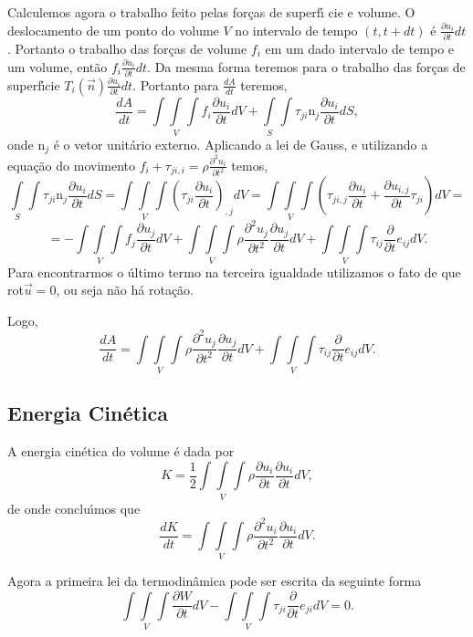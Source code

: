 Calculemos agora  o trabalho feito pelas for\c{c}as de superf\'\i
cie e volume. O deslocamento de um ponto do volume $V$ no
intervalo de tempo $(t,t+dt)$ \'e $\frac{\partial u_{i}}{\partial
t}dt$. Portanto o trabalho das  for\c{c}as de volume $f_{i}$ em um
dado intervalo de tempo e um volume, ent\~ao $f_{i}\frac{\partial
u_{i}}{\partial t}dt$. Da mesma forma teremos para o trabalho das
for\c{c}as de  superf\'\i cie $T_{i}(\vec{n})\frac{\partial
u_{i}}{\partial t}dt$. Portanto para $\frac{dA}{dt}$ teremos,
\[\frac{dA}{dt}=\int \! \!\int\limits_{V} \! \!\int f_{i}\frac{\partial u_{i}}{\partial t}dV+\int\limits_{S} \! \!\int
\tau_{ji}\mbox{n}_{j}\frac{\partial u_{i}}{\partial t}dS,\] onde
$\mbox{n}_{j}$ \'e o vetor unit\'ario externo. Aplicando a lei de
Gauss, e utilizando a equa\c{c}\~ao do movimento $f_{i}+\tau_{ji,i}=\rho\frac{\partial^{2}u_{i}}{\partial t^{2}}$ temos,
\[\int\limits_{S} \! \!\int \tau_{ji}\mbox{n}_{j}\frac{\partial u_{i}}{\partial t}dS=
\int \! \!\int\limits_{V} \! \!\int \left(\tau_{ji}\frac{\partial
u_{i}}{\partial t}\right)_{,j}dV= \int \! \!\int\limits_{V} \!
\!\int \left(\tau_{ji,j}\frac{\partial u_{i}}{\partial t}+
\frac{\partial u_{i,j}}{\partial t}\tau_{ji}\right)dV=\]
\[=-\int \! \!\int\limits_{V} \! \!\int f_{j}\frac{\partial u_{j}}{\partial t}dV+
\int \! \!\int\limits_{V} \! \!\int \rho\frac{\partial^{2}
u_{j}}{\partial t^{2}}\frac{\partial u_{j}}{\partial t}dV+ \int \!
\!\int\limits_{V} \! \!\int \tau_{ij}\frac{\partial}{\partial
t}e_{ij}dV.\] Para encontrarmos o \'ultimo termo na terceira igualdade utilizamos o fato de que rot$\vec{u}=0$, ou 
seja n\~ao h\'a rota\c{c}\~ao.

Logo,
\[\frac{dA}{dt}=\int \! \!\int\limits_{V} \! \!\int \rho\frac{\partial^{2} u_{j}}{\partial t^{2}}\frac{\partial u_{j}}{\partial t}dV+
\int \! \!\int\limits_{V} \! \!\int
\tau_{ij}\frac{\partial}{\partial t}e_{ij}dV.\]

\subsection{Energia Cin\'etica}

A energia cin\'etica do volume \'e dada por
\[K=\frac{1}{2}\int \! \!\int\limits_{V} \! \!\int \rho\frac{\partial u_{i}}{\partial t}
\frac{\partial u_{i}}{\partial t}dV,\]
de onde conclu\'\i mos que
\[\frac{dK}{dt}=\int \! \!\int\limits_{V} \! \!\int \rho\frac{\partial^{2} u_{i}}{\partial t^{2}}
\frac{\partial u_{i}}{\partial t}dV.\]

Agora a primeira lei da termodin\^amica pode ser escrita da seguinte forma
\[\int \! \!\int\limits_{V} \! \!\int \frac{\partial W}{\partial t} dV-
\int \! \!\int\limits_{V} \! \!\int
\tau_{ji}\frac{\partial}{\partial t}e_{ji}dV=0.\]

